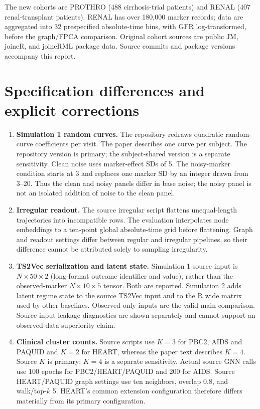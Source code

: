 \documentclass[11pt,a4paper]{article}
\begin{document}
The new cohorts are PROTHRO (488 cirrhosis-trial patients) and RENAL (407 renal-transplant patients). RENAL has over 180,000 marker records; data are aggregated into 32 prespecified absolute-time bins, with GFR log-transformed, before the graph/FPCA comparison. Original cohort sources are public JM, joineR, and joineRML package data. Source commits and package versions accompany this report.

\section{Specification differences and explicit corrections}
\begin{enumerate}
\item \textbf{Simulation 1 random curves.} The repository redraws quadratic random-curve coefficients per visit. The paper describes one curve per subject. The repository version is primary; the subject-shared version is a separate sensitivity. Clean noise uses marker-effect SDs of 5. The noisy-marker condition starts at 3 and replaces one marker SD by an integer drawn from 3--20. Thus the clean and noisy panels differ in base noise; the noisy panel is not an isolated addition of noise to the clean panel.
\item \textbf{Irregular readout.} The source irregular script flattens unequal-length trajectories into incompatible rows. The evaluation interpolates node embeddings to a ten-point global absolute-time grid before flattening. Graph and readout settings differ between regular and irregular pipelines, so their difference cannot be attributed solely to sampling irregularity.
\item \textbf{TS2Vec serialization and latent state.} Simulation 1 source input is $N\times50\times2$ (long-format outcome identifier and value), rather than the observed-marker $N\times10\times5$ tensor. Both are reported. Simulation 2 adds latent regime state to the source TS2Vec input and to the R wide matrix used by other baselines. Observed-only inputs are the valid main comparison. Source-input leakage diagnostics are shown separately and cannot support an observed-data superiority claim.
\item \textbf{Clinical cluster counts.} Source scripts use $K=3$ for PBC2, AIDS and PAQUID and $K=2$ for HEART, whereas the paper text describes $K=4$. Source $K$ is primary; $K=4$ is a separate sensitivity. Actual source GNN calls use 100 epochs for PBC2/HEART/PAQUID and 200 for AIDS. Source HEART/PAQUID graph settings use ten neighbors, overlap 0.8, and walk/top-$k$ 5. HEART's common extension configuration therefore differs materially from its primary configuration.

\end{enumerate}
\end{document}
